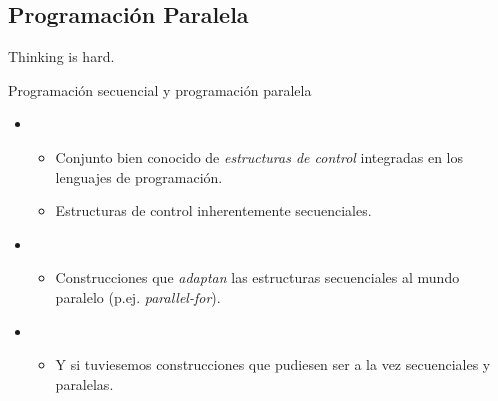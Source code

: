 \subsection{Programación Paralela}

\begin{frame}
\begin{LARGE}
\begin{center}
Thinking  is hard.
\end{center}
\end{LARGE}
\hfill {}
\hfill {}
\end{frame}

\begin{frame}[t]{Programación secuencial y programación paralela}
\begin{itemize}
\item {}
  \begin{itemize}
    \item Conjunto bien conocido de \emph{estructuras de control} integradas en los lenguajes de programación.
    \item Estructuras de control inherentemente secuenciales.
  \end{itemize}
\vfill\pause
\item {}
  \begin{itemize}
    \item Construcciones que \emph{adaptan} las estructuras secuenciales al mundo paralelo
          (p.ej. \emph{parallel-for}).
  \end{itemize}
\vfill\pause
\item {}
  \begin{itemize}
    \item Y si tuviesemos construcciones que pudiesen ser a la vez secuenciales y paralelas.
  \end{itemize}
\end{itemize}
\end{frame}
